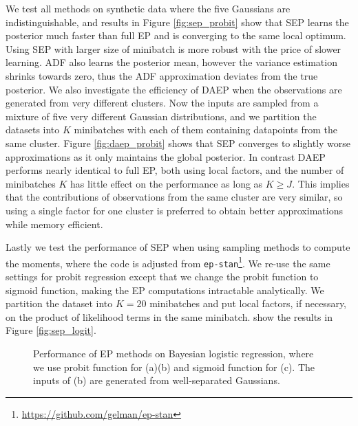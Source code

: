 We test all methods on synthetic data where the five Gaussians are indistinguishable, and results in Figure \ref{fig:sep_probit} show that SEP learns the posterior much faster than full EP and is converging to the same local optimum. Using SEP with larger size of minibatch is more robust with the price of slower learning. ADF also learns the posterior mean, however the variance estimation shrinks towards zero, thus the ADF approximation deviates from the true posterior. 
%
We also investigate the efficiency of DAEP when the observations are generated from very different clusters. Now the  inputs are sampled from a mixture of five very different Gaussian distributions, and we partition the datasets into $K$ minibatches with each of them containing datapoints from the same cluster. Figure \ref{fig:daep_probit} shows that SEP converges to slightly worse approximations as it only maintains the global posterior. In contrast DAEP performs nearly identical to full EP, both using local factors, and the number of minibatches $K$ has little effect on the performance as long as $K \geq J$. This implies that the contributions of observations from the same cluster are very similar, so using a single factor for one cluster is preferred to obtain better approximations while memory efficient.

Lastly we test the performance of SEP when using sampling methods to compute the moments, where the code is adjusted from \texttt{ep-stan}\footnote{\url{https://github.com/gelman/ep-stan}}. We re-use the same settings for probit regression except that we change the probit function to sigmoid function, making the EP computations intractable analytically. We partition the dataset into $K = 20$ minibatches and put local factors, if necessary, on the product of likelihood terms in the same minibatch. show the results in Figure \ref{fig:sep_logit}.

\begin{figure}
\centering
\def\svgwidth{0.3\linewidth}
\subfigure[\label{fig:sep_probit}]{
}
%
%
\def\svgwidth{0.3\linewidth}
\subfigure[\label{fig:daep_probit}]{
}
%
%
\def\svgwidth{0.3\linewidth}
\subfigure[\label{fig:sep_logit}]{
}

\caption{Performance of EP methods on Bayesian logistic regression, where we use probit function for (a)(b) and sigmoid function for (c). The inputs of (b) are generated from well-separated Gaussians.}

\end{figure}
